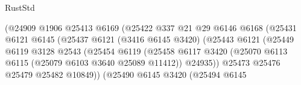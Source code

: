 \begin{lexlean}{RustStd}
\begin{coremodule}
                                              (@24909
                                                @1906
                                                @25413
                                                @6169
                                                (@25422
                                                  @337
                                                  @21
                                                  @29
                                                  @6146
                                                  @6168
                                                  (@25431
                                                    @6121
                                                    @6145
                                                    (@25437
                                                      @6121
                                                      (@3416 @6145 @3420)
                                                      (@25443
                                                        @6121
                                                        (@25449
                                                          @6119
                                                          @3128
                                                          @2543
                                                          (@25454
                                                            @6119
                                                            (@25458
                                                              @6117
                                                              @3420
                                                              (@25070
                                                                @6113
                                                                @6115
                                                                (@25079 @6103 @3640 @25089 @11412))
                                                              @24935))
                                                          @25473
                                                          @25476
                                                          @25479
                                                          @25482
                                                          @10849))
                                                      (@25490
                                                        @6145
                                                        @3420
                                                        (@25494
                                                          @6145

\end{coremodule}
\end{lexlean}
